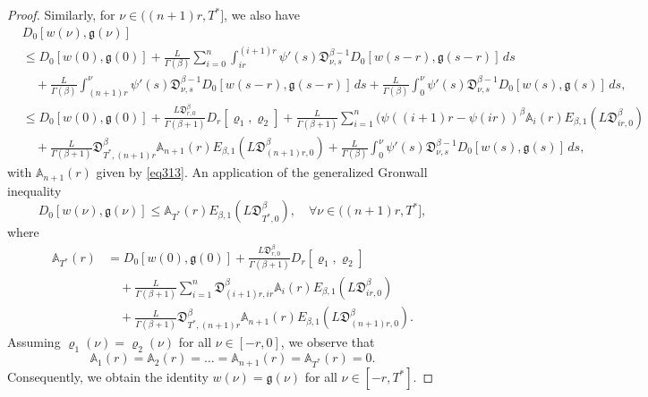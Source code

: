 \documentclass[10pt,a4paper]{amsart}
\numberwithin{equation}{section}
\begin{document}
\begin{proof}
 Similarly, for $\nu \in((n+1) r, T^{*}]$, we also have
\begin{align*}
&D_0[ w(\nu ), \mathfrak{g}(\nu )] \\
&\leq  D_0[ w(0), \mathfrak{g}(0)]+\frac{ L}{\Gamma(\beta)} \sum_{i=0}^{n}
  \int_{i r}^{(i+1) r} \psi'(s)\mathfrak{D}_{\nu ,s}^{\beta-1} D_0[ w(s- r), 
  \mathfrak{g}(s- r)]\,ds \\
&\quad +\frac{ L}{\Gamma(\beta)} \int_{(n+1) r}^{\nu } 
 \psi'(s)\mathfrak{D}_{\nu ,s}^{\beta-1} D_0[ w(s- r), \mathfrak{g}(s- r)]\,ds 
 +\frac{ L}{\Gamma(\beta)} \int_0^{\nu } \psi'(s)\mathfrak{D}_{\nu ,s}^{\beta-1} D_0[ w(s), \mathfrak{g}(s)]\,ds, \\
&\leq  D_0[ w(0), \mathfrak{g}(0)]+\frac{ L\mathfrak{D}_{ r,0}^{\beta}}{\Gamma(\beta+1)}
 D_{ r}[\varrho_{1}, \varrho_{2}] 
+\frac{ L}{\Gamma(\beta+1)} \sum_{i=1}^{n}(\psi((i+1) r-\psi(i r))^{\beta} \mathbb{A}_{i}( r) E_{\beta, 1}( L\mathfrak{D}_{i r,0}^{\beta}) \\
&\quad +\frac{ L}{\Gamma(\beta+1)}\mathfrak{D}_{T^{*},(n+1) r}^{\beta} \mathbb{A}_{n+1}
 ( r) E_{\beta, 1}( L\mathfrak{D}_{(n+1) r,0}^{\beta}) 
 +\frac{ L}{\Gamma(\beta)} \int_0^{\nu } \psi'(s)\mathfrak{D}_{\nu ,s}^{\beta-1} D_0[ w(s), \mathfrak{g}(s)]\,ds,
\end{align*}
with $\mathbb{A}_{n+1}( r)$ given by \eqref{eq313}. An application of the generalized 
Gronwall inequality
\begin{equation}\label{ineq314}
D_0[ w(\nu ), \mathfrak{g}(\nu )] \leq \mathbb{A}_{T^{*}}( r)
 E_{\beta, 1}( L\mathfrak{D}_{T^{*},0}^{\beta}), \quad 
 \forall \nu \in((n+1) r, T^{*}], 
\end{equation}
where
\begin{align*}
\mathbb{A}_{T^{*}}( r)
&=  D_0[ w(0), \mathfrak{g}(0)]
 +\frac{ L\mathfrak{D}_{ r,0}^{\beta}}{\Gamma(\beta+1)} 
 D_{ r}[\varrho_{1}, \varrho_{2}] \\
&\quad+\frac{ L}{\Gamma(\beta+1)} \sum_{i=1}^{n}\mathfrak{D}_{(i+1) r,i r}^{\beta} 
 \mathbb{A}_{i}( r) E_{\beta, 1}( L\mathfrak{D}_{i r,0}^{\beta}) \\
&\quad +\frac{ L}{\Gamma(\beta+1)}\mathfrak{D}_{T^{*},(n+1) r}^{\beta} 
 \mathbb{A}_{n+1}( r) E_{\beta, 1}( L\mathfrak{D}_{(n+1) r,0}^{\beta}) .
\end{align*}
Assuming $\varrho_1(\nu ) = \varrho_2(\nu )$ for all $\nu \in [- r, 0]$,
 we observe that
\[
\mathbb{A}_1( r) = \mathbb{A}_2( r) = \dots 
= \mathbb{A}_{n+1}( r) = \mathbb{A}_{T^*}( r) = 0.
\]
Consequently, we obtain the identity $ w(\nu ) = \mathfrak{g}(\nu )$ for all 
$\nu \in [- r, T^*]$.
\end{proof}
\end{document}
